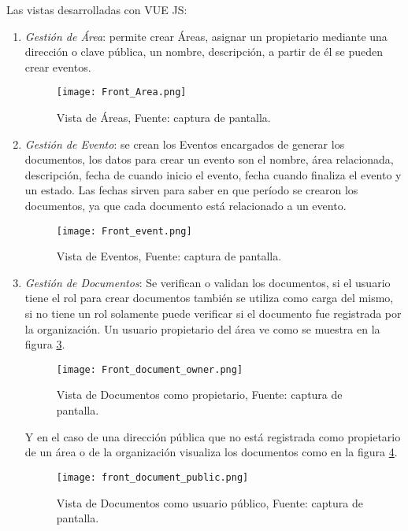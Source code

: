 Las vistas desarrolladas  con VUE JS:
\begin{enumerate}
  \item \textit{Gestión de Área}: permite crear  Áreas, asignar un propietario mediante una dirección o clave pública, un nombre, descripción,
  a partir de él se pueden crear eventos.

  \begin{figure}[H]
    \centering
    {\texttt{[image: Front\_Area.png]}}
    \caption{Vista de Áreas,  Fuente: captura de pantalla. }
    \label{img:front_area}
  \end{figure}

  \item \textit{Gestión de Evento}: se crean los Eventos encargados de generar los documentos, los datos para crear un evento son el nombre, 
  área relacionada, descripción, fecha de cuando inicio el evento, fecha cuando finaliza el evento y un estado. 
  Las fechas sirven para saber en que período se crearon los documentos, ya que cada documento está relacionado  a un evento.
  
  \begin{figure}[H]
    \centering
    {\texttt{[image: Front\_event.png]}}
    \caption{Vista de Eventos,  Fuente: captura de pantalla. }
    \label{img:front_event}
  \end{figure}     
  
  \item \textit{Gestión de Documentos}: Se verifican o validan los documentos, si el usuario tiene el rol para crear documentos 
  también se utiliza como carga del mismo, si no tiene un rol solamente puede verificar si el documento fue registrada por la organización. 
  Un usuario propietario del área ve como se muestra en la figura \ref{img:front_document_owner}.

  \begin{figure}[H]
    \centering
    {\texttt{[image: Front\_document\_owner.png]}}
    \caption{Vista de Documentos como propietario,  Fuente: captura de pantalla. }
    \label{img:front_document_owner}
  \end{figure}
  Y en el caso de una dirección pública que 
  no está registrada como propietario de un área o de la organización visualiza los documentos como en la figura \ref{img:front_document_public}.
  \begin{figure}[H]
    \centering
    {\texttt{[image: front\_document\_public.png]}}
    \caption{Vista de Documentos como usuario público,  Fuente: captura de pantalla. }
    \label{img:front_document_public}
  \end{figure}


\end{enumerate}
